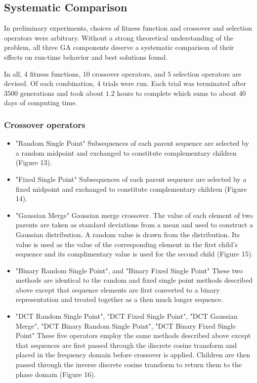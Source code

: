 \documentclass[12pt]{article}
\begin{document}
\subsection{Systematic Comparison}
In preliminary experiments, choices of fitness function and crossover and
selection operators were arbitrary.
Without a strong theoretical understanding of the problem, all three GA
components deserve a
systematic comparison of their effects on run-time behavior and best
solutions found.

In all, $4$ fitness functions, $10$ crossover operators, and $5$ selection
operators
are devised.  Of each combination, 4 trials were run.  Each trial was
terminated after $3500$ generations and took about $1.2$ hours to complete
which sums to about $40$ days of computing time.

\subsubsection{Crossover operators}
\begin{itemize}
\item "Random Single Point"  Subsequences of each parent sequence are selected by a random midpoint and exchanged to constitute complementary children (Figure 13).
\item "Fixed Single Point"  Subsequences of each parent sequence are selected by a fixed midpoint and exchanged to constitute complementary children (Figure 14).
\item "Gaussian Merge"  Gaussian merge crossover.  The value of each element of two parents are taken as standard deviations from a mean and used to construct a Gaussian distribution.  A random value is drawn from the distribution.  Its value is used as the value of the corresponding element in the first child's sequence and its complimentary value is used for the second child (Figure 15).
\item "Binary Random Single Point", and "Binary Fixed Single Point"  These two methods are identical to the random and fixed single point
methods described above except that sequence elements are first converted
to a binary representation and treated together as a then much longer sequence.
\item "DCT Random Single Point", "DCT Fixed Single Point", "DCT Gaussian Merge", "DCT Binary Random Single Point", "DCT Binary Fixed Single Point"  These five operators employ the same methods described above except that sequences are first passed through the discrete cosine transform and placed in the frequency domain before crossover is applied.  Children are then passed through the inverse discrete cosine transform to return them to the phase domain (Figure 16).
\end{itemize}
\end{document}
